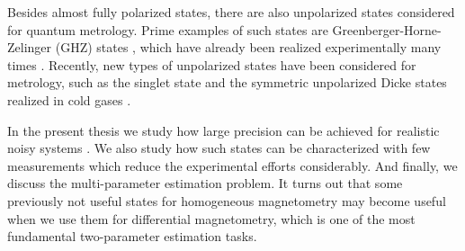 Besides almost fully polarized states, there are also unpolarized states considered for quantum metrology.
Prime examples of such states are Greenberger-Horne-Zelinger (GHZ) states \citep{Greenberger1990}, which have already been realized experimentally many times \citep{Leibfried2004, Bouwmeester1999, Pan2000, Zhao2003, Lu2007, Gao2010, Sackett2000, Monz2011}.
Recently, new types of unpolarized states have been considered for metrology, such as the singlet state \citep{Urizar-Lanz2013, Behbood2014} and the symmetric unpolarized Dicke states realized in cold gases \citep{Luecke2011, Hamley2012, Krischek2011}.

In the present thesis we study how large precision can be achieved for realistic noisy systems \citep{Escher2011, Demkowicz-Dobrzanski2012}.
We also study how such states can be characterized with few measurements which reduce the experimental efforts considerably.
And finally, we discuss the multi-parameter estimation problem.
It turns out that some previously not useful states for homogeneous magnetometry may become useful when we use them for differential magnetometry, which is one of the most fundamental two-parameter estimation tasks.
